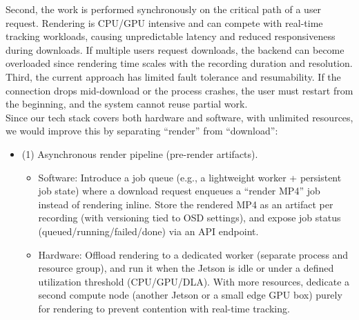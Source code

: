 \documentclass[12pt, titlepage]{article}
\begin{document}
\begin{enumerate}
        Second, the work is performed synchronously on the critical path of a user
        request. Rendering is CPU/GPU intensive and can compete with real-time tracking
        workloads, causing unpredictable latency and reduced responsiveness during
        downloads. If multiple users request downloads, the backend can become
        overloaded since rendering time scales with the recording duration and
        resolution.\\[2mm]

        Third, the current approach has limited fault tolerance and resumability. If
        the connection drops mid-download or the process crashes, the user must restart
        from the beginning, and the system cannot reuse partial work.\\[2mm]

        Since our tech stack covers both hardware and software, with unlimited
        resources, we would improve this by separating ``render'' from ``download'':
        \begin{itemize}
          \item (1) Asynchronous render pipeline (pre-render artifacts).
                \begin{itemize}
                  \item Software: Introduce a job queue (e.g., a lightweight worker + persistent job
                        state) where a download request enqueues a ``render MP4'' job instead of
                        rendering inline. Store the rendered MP4 as an artifact per recording (with
                        versioning tied to OSD settings), and expose job status
                        (queued/running/failed/done) via an API endpoint.
                  \item Hardware: Offload rendering to a dedicated worker (separate process and
                        resource group), and run it when the Jetson is idle or under a defined
                        utilization threshold (CPU/GPU/DLA). With more resources, dedicate a second
                        compute node (another Jetson or a small edge GPU box) purely for rendering to
                        prevent contention with real-time tracking.
                \end{itemize}


\end{itemize}
\end{enumerate}
\end{document}
